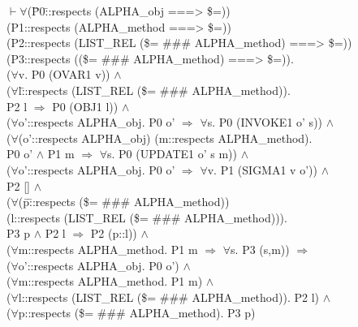\documentclass[envcountsame,runningheads]{llncs}
\begin{document}
{\tt \begin{tabbing}
$\vdash \forall$(\=P0\=::respects (ALPHA\_obj ===> \$=)) \\
\>\>  (P1::respects (ALPHA\_method ===> \$=)) \\
\>\>  (P2::respects (LIST\_REL (\$= \#\#\# ALPHA\_method) ===> \$=)) \\
\>\>  (P3::respects ((\$= \#\#\# ALPHA\_method) ===> \$=)). \\
\>   ($\forall$v. P0 (OVAR1 v)) $\wedge$ \\
\>   ($\forall$l\=::respects (LIST\_REL (\$= \#\#\# ALPHA\_method)). \\
\>\>    P2 l $\Rightarrow$ P0 (OBJ1 l)) $\wedge$ \\
\>   ($\forall$o'::respects ALPHA\_obj. P0 o' $\Rightarrow$ $\forall$s. P0 (INVOKE1 o' s)) $\wedge$ \\
\>   ($\forall$(o'::respects ALPHA\_obj) (m::respects ALPHA\_method). \\
\>\>    P0 o' $\wedge$ P1 m $\Rightarrow$ $\forall$s. P0 (UPDATE1 o' s m)) $\wedge$ \\
\>   ($\forall$o'::respects ALPHA\_obj. P0 o' $\Rightarrow$ $\forall$v. P1 (SIGMA1 v o')) $\wedge$ \\
\>   P2 [] $\wedge$ \\
\>   ($\forall$(\=p\=::respects (\$= \#\#\# ALPHA\_method)) \\
\>\>\>   (l::respects (LIST\_REL (\$= \#\#\# ALPHA\_method))). \\
\>\>    P3 p $\wedge$ P2 l $\Rightarrow$ P2 (p::l)) $\wedge$ \\
\>   ($\forall$m::respects ALPHA\_method. P1 m $\Rightarrow$ $\forall$s. P3 (s,m)) $\Rightarrow$ \\
\>   ($\forall$o'::respects ALPHA\_obj. P0 o') $\wedge$ \\
\>   ($\forall$m::respects ALPHA\_method. P1 m) $\wedge$ \\
\>   ($\forall$l::respects (LIST\_REL (\$= \#\#\# ALPHA\_method)). P2 l) $\wedge$ \\
\>   ($\forall$p::respects (\$= \#\#\# ALPHA\_method). P3 p)
\end{tabbing}}
\end{document}
